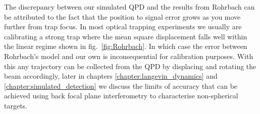 The discrepancy between our simulated QPD and the results from 
Rohrbach can be attributed to the fact that the position to 
signal error grows as you move further from trap focus. In most
optical trapping experiments we usually are calibrating a strong
trap where the mean square displacement falls well within the
linear regime shown in fig.~\ref{fig:Rohrbach}. In which case the
error between Rohrbach's model and our own is inconsequential for 
calibration purposes. With this any trajectory can be collected 
from the QPD by displacing and rotating the beam accordingly, 
later in chapters \ref{chapter:langevin_dynamics} and \ref{chapter:simulated_detection} we discuss the limits of accuracy
that can be achieved using back focal plane interferometry to 
characterise non-spherical targets. 
